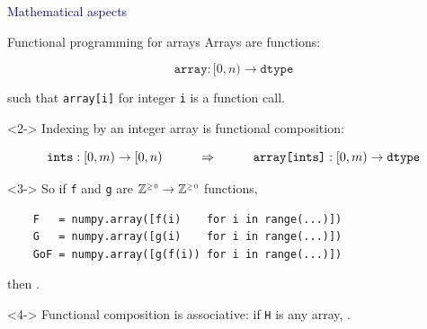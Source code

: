 \documentclass[aspectratio=169]{beamer}
\begin{document}
\begin{frame}{}
\huge
\vspace{1 cm}
\begin{center}
\textcolor{darkblue}{Mathematical aspects}
\end{center}
\end{frame}

\begin{frame}[fragile]{Functional programming for arrays}
\large
\vspace{0.4 cm}
Arrays are functions:

\vspace{-0.45 cm}
\[ \texttt{array}: [0, n) \to \texttt{dtype} \]

\vspace{0.15 cm}
such that \texttt{array[i]} for integer \texttt{i} is a function call.

\vspace{0.5 cm}
\begin{uncoverenv}<2->
Indexing by an integer array is functional composition:

\vspace{-0.5 cm}
\[ \texttt{ints}: [0, m) \to [0, n) \hspace{1 cm}\Rightarrow\hspace{1 cm} \texttt{array[ints]}: [0, m) \to \texttt{dtype} \]
\end{uncoverenv}

\vspace{-0.35 cm}
\begin{uncoverenv}<3->
So if \texttt{f} and \texttt{g} are $\mathbb{Z}^{\mbox{\tiny $\ge\hspace{-0.05 cm}0$}} \to \mathbb{Z}^{\mbox{\tiny $\ge\hspace{-0.05 cm}0$}}$ functions,
\normalsize
\begin{verbatim}
    F   = numpy.array([f(i)    for i in range(...)])
    G   = numpy.array([g(i)    for i in range(...)])
    GoF = numpy.array([g(f(i)) for i in range(...)])
\end{verbatim}

\large
\vspace{0.1 cm}
then .
\end{uncoverenv}

\vspace{0.5 cm}
\begin{uncoverenv}<4->
Functional composition is associative: if \texttt{H} is any array, .
\end{uncoverenv}
\end{frame}
\end{document}
